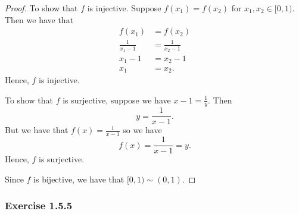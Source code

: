 \begin{enumerate}
\begin{proof}
        To show that \( f \) is injective. Suppose \( f(x_1) = f(x_2) \) for \( x_1, x_2 \in [0,1)\). Then we have that 
        \begin{align*}
        f(x_1)&=f(x_2) \\
        \frac{1}{x_1-1} &= \frac{1}{x_2-1} \\
        x_1 - 1 &= x_2 - 1 \\
        x_1 &= x_2.
        \end{align*}
        Hence, \( f \) is injective. 

        To show that \( f \) is surjective, suppose we have \( x-1 = \frac{1}{y} \). Then 
        \[ y = \frac{1}{x-1}.\] But we have that \( f(x) = \frac{1}{x-1}\) so we have 
        \[ f(x) = \frac{1}{x-1} = y. \] Hence, \( f \) is surjective.

        Since \( f \) is bijective, we have that \( [0,1) \sim (0,1)\).
    \end{proof}
\end{enumerate}







\subsubsection{Exercise 1.5.5}

